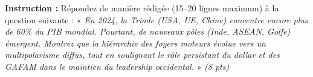 \documentclass[11pt]{article}
\begin{document}
\begin{exercice}
\label{exo:synthese}
\textbf{Instruction :} Répondez de manière rédigée (15--20 lignes maximum) à la question suivante :
« \textit{En 2024, la Triade (USA, UE, Chine) concentre encore plus de 60\% du PIB mondial. Pourtant, de nouveaux pôles (Inde, ASEAN, Golfe) émergent. Montrez que la hiérarchie des foyers moteurs évolue vers un multipolarisme diffus, tout en soulignant le rôle persistant du dollar et des GAFAM dans le maintien du leadership occidental.} » \textit{(8 pts)}
\end{exercice}
\end{document}

